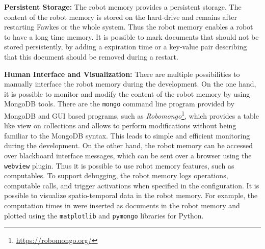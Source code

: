 \textbf{Persistent Storage:}
The robot memory provides a persistent storage. The content of the
robot memory is stored on the hard-drive and remains after restarting
Fawkes or the whole system. Thus the robot memory enables a robot to
have a long time memory. It is possible to mark documents that should
not be stored persistently, by adding a expiration time or a key-value
pair describing that this document should be removed during a restart.

\textbf{Human Interface and Visualization:}
There are multiple possibilities to manually interface the robot
memory during the development. On the one hand, it is possible to
monitor and modify the content of the robot memory by using MongoDB
tools. There are the \texttt{mongo} command line program provided by
MongoDB and GUI based programs, such as
\emph{Robomongo}\footnote{\url{https://robomongo.org/}}, which
provides a table like view on collections and allows to perform
modifications without being familiar to the MongoDB syntax. This
leads to simple and efficient monitoring during the development.
On the other hand, the robot memory can be
accessed over blackboard interface messages, which can be sent over a
browser using the \texttt{webview} plugin. Thus it is possible to use
robot memory features, such as computables. To support debugging, the
robot memory logs operations, computable calls, and trigger
activations when specified in the configuration. It is possible to
visualize spatio-temporal data in the robot memory. For example, the
computation times in  were inserted as
documents in the robot memory and plotted using the
\texttt{matplotlib} and \texttt{pymongo} libraries for Python.


